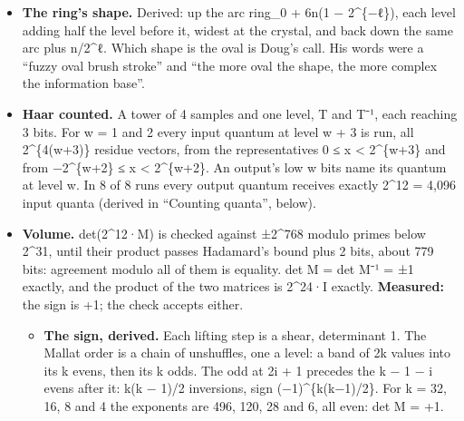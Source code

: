 \begin{itemize}
\begin{itemize}
\item The mirror floor adds one bit for each of its n/2\textasciicircum{}ℓ rebuilt lows, the wrap's + 1.
\item The formula reproduces the replica's column in vertical\_\allowbreak{}time\_\allowbreak{}compression.md (16-bit samples, n = 64, L = 6): 1,024, 1,216, 1,312, 1,360, 1,384, 1,396 and 1,402 going up, 1,398, 1,388, 1,368, 1,328 and 1,248 coming down. The replica's T⁻¹ 0 read 1,024, with the samples wrapped to 16 bits. The scratch run there wrapped them to 17 and read 1,088 = 1,024 + 64, as the formula gives.
\item The growth is 6n(1 − 2\textasciicircum{}\{−L\}) < 6n for every L: under 6 bits a sample, however many levels.
\end{itemize}
\item \textbf{The ring's shape.} Derived: up the arc ring\_\allowbreak{}0 + 6n(1 − 2\textasciicircum{}\{−ℓ\}), each level adding half the level before it, widest at the crystal, and back down the same arc plus n/2\textasciicircum{}ℓ. Which shape is the oval is Doug's call. His words were a “fuzzy oval brush stroke” and “the more oval the shape, the more complex the information base”.
\item \textbf{Haar counted.} A tower of 4 samples and one level, T and T⁻¹, each reaching 3 bits. For w = 1 and 2 every input quantum at level w + 3 is run, all 2\textasciicircum{}\{4(w+3)\} residue vectors, from the representatives 0 ≤ x < 2\textasciicircum{}\{w+3\} and from −2\textasciicircum{}\{w+2\} ≤ x < 2\textasciicircum{}\{w+2\}. An output's low w bits name its quantum at level w. In 8 of 8 runs every output quantum receives exactly 2\textasciicircum{}12 = 4,096 input quanta (derived in “Counting quanta”, below).
\item \textbf{Volume.} det(2\textasciicircum{}12·M) is checked against ±2\textasciicircum{}768 modulo primes below 2\textasciicircum{}31, until their product passes Hadamard's bound plus 2 bits, about 779 bits: agreement modulo all of them is equality. det M = det M⁻¹ = ±1 exactly, and the product of the two matrices is 2\textasciicircum{}24·I exactly. \textbf{Measured:} the sign is +1; the check accepts either.

\begin{itemize}
\item \textbf{The sign, derived.} Each lifting step is a shear, determinant 1. The Mallat order is a chain of unshuffles, one a level: a band of 2k values into its k evens, then its k odds. The odd at 2i + 1 precedes the k − 1 − i evens after it: k(k − 1)/2 inversions, sign (−1)\textasciicircum{}\{k(k−1)/2\}. For k = 32, 16, 8 and 4 the exponents are 496, 120, 28 and 6, all even: det M = +1.
\end{itemize}
\end{itemize}

